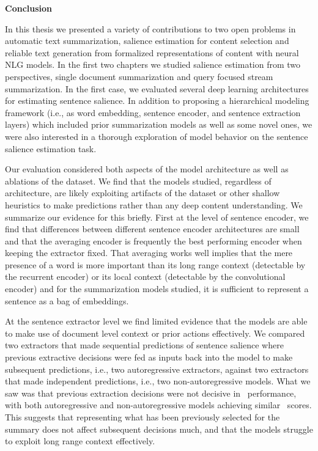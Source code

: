 \begin{center}
    \pagebreak
    \vspace*{5\baselineskip}
    \textbf{\large Conclusion}
\end{center}

\label{ch:conclusion}

\startglyph In this thesis we presented a variety of contributions to two open
problems in automatic text summarization, salience estimation for content
selection and reliable text generation from formalized representations of
content with neural NLG models.  In the first two chapters we studied salience
estimation from two perspectives, single document summarization and query
focused stream summarization. In the first case, we evaluated several deep
learning architectures for estimating sentence salience. In addition to
proposing a hierarchical modeling framework (i.e., as word embedding, sentence
encoder, and sentence extraction layers) which included prior summarization
models as well as some novel ones, we were also interested in a thorough
exploration of model behavior on the sentence salience estimation task.

Our evaluation considered both aspects of the model architecture as well as
ablations of the dataset. We find that the models studied, regardless of
architecture, are likely exploiting artifacts of the dataset or other shallow
heuristics to make predictions rather than any deep content understanding.  We
summarize our evidence for this briefly. First at the level of sentence
encoder, we find that differences between different sentence encoder
architectures are small and that the averaging encoder is frequently the best
performing encoder when keeping the extractor fixed. That averaging works well
implies that the mere presence of a word is more important than its long range
context (detectable by the recurrent encoder) or its local context (detectable
by the convolutional encoder) and for the summarization models studied, 
it is sufficient to represent a sentence as a bag of embeddings. 

At the sentence extractor level we find limited evidence that the models are
able to make use of document level context or prior actions effectively.  We
compared two extractors that made sequential predictions of sentence salience
where previous extractive decisions were fed as inputs back into the model to
make subsequent predictions, i.e., two autoregressive extractors, against two
extractors that made independent predictions, i.e., two non-autoregressive
models. What we saw was that previous extraction decisions were not decisive
in \rouge~performance, with both autoregressive and non-autoregressive models
achieving similar \rouge~scores. This suggests that representing what has been
previously selected for the summary does not affect subsequent decisions much,
and that the models struggle to exploit long range context effectively.

